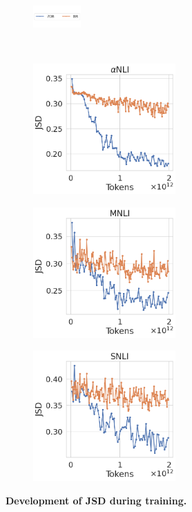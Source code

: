 \begin{figure}[t]
    \begin{subfigure}[b]{\textwidth}
        \includegraphics[width=0.2\textwidth]{figures/chaos_jsd_training_legend}
        \vspace{-2mm}
    \end{subfigure}\\
    \begin{subfigure}[b]{0.32\textwidth}
        \includegraphics[height=5cm]{figures/abductivenli_intermediate_jsd}
        \caption{}
    \end{subfigure}
    \begin{subfigure}[b]{0.32\textwidth}
        \includegraphics[height=5cm, trim=11mm 0 0 0, clip]{figures/mnli_matched_intermediate_jsd}
        \caption{}
    \end{subfigure}
    \begin{subfigure}[b]{0.32\textwidth}
        \includegraphics[height=5cm, trim=11mm 0 0 0, clip]{figures/snli_intermediate_jsd}
        \caption{}
    \end{subfigure}
    \caption{\textbf{Development of JSD during training.}}\label{fig:jsd_training}
\end{figure}

